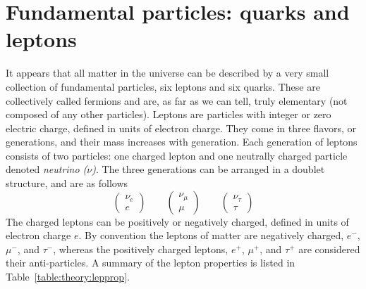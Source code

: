 \section{Fundamental particles: quarks and leptons}
It appears that all matter in the universe can be described by a very small collection of fundamental particles, six leptons and six quarks. These are collectively called fermions and are, as far as we can tell, truly elementary (not composed of any other particles).
Leptons are particles with integer or zero electric charge, defined in units of electron charge. They come in three flavors, or generations, and their mass increases with generation. Each generation of leptons consists of two particles: one charged lepton and one neutrally charged particle denoted \emph{neutrino ($\nu$)}. The three generations can be arranged in a doublet structure, and are as follows
\begin{equation}
\label{eqn:lepton_flavor_doublets}
\begin{pmatrix} \nu_e      \\ e      \end{pmatrix} \qquad
\begin{pmatrix} \nu_{\mu}  \\ \mu    \end{pmatrix} \qquad
\begin{pmatrix} \nu_{\tau} \\ \tau   \end{pmatrix}
\end{equation}
The charged leptons can be positively or negatively charged, defined in units of electron charge $e$. By convention the leptons of matter are negatively charged, $e^{-}$, $\mu^{-}$, and $\tau^{-}$,  whereas the positively charged leptons,  $e^{+}$, $\mu^{+}$, and $\tau^{+}$ are considered their anti-particles.
A summary of the lepton properties is listed in Table~\ref{table:theory:lepprop}.

